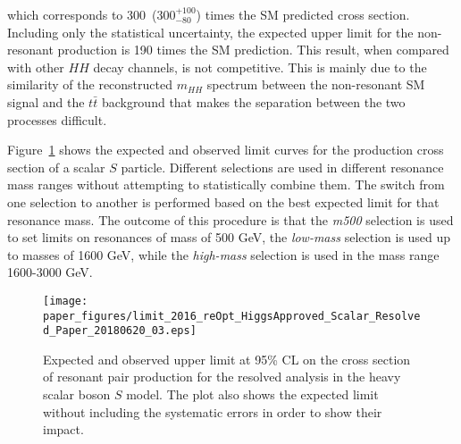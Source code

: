 which corresponds to 300~(300$^{+100}_{-80}$) times the SM predicted cross section.
Including only the statistical uncertainty, the expected upper limit for the non-resonant production is
190 times the SM prediction.
This result, when compared with other $HH$ decay channels, is not competitive.  This is mainly  due to the similarity of the reconstructed $m_{HH}$ spectrum between the non-resonant SM signal
and the $t\bar{t}$ background that makes the separation between the
two processes difficult.
 
Figure~\ref{fig:limit} shows the expected and observed limit
curves for the production cross section of a scalar $S$ particle.
Different selections are used in different resonance mass ranges without attempting to statistically combine them. The
switch from one selection to another is performed based on the
best expected limit for that resonance mass.
The outcome of this procedure is that the \emph{m500} selection is used to set limits on resonances of mass of 500 GeV,  the \emph{low-mass}   selection is used up to masses of 1600 GeV, while the \emph{high-mass} selection is used in the mass range 1600-3000 GeV.
 
 
\begin{figure}[!h]
\begin{center}
\texttt{[image: paper\_figures/limit\_2016\_reOpt\_HiggsApproved\_Scalar\_Resolved\_Paper\_20180620\_03.eps]}
\caption{Expected and observed upper limit at 95\% CL on the cross section of resonant pair
         production for the resolved analysis in the heavy scalar boson $S$ model. The plot also shows the expected limit
         without including the systematic errors in order to show their impact.
          }
\label{fig:limit}
\end{center}
\end{figure}
 
